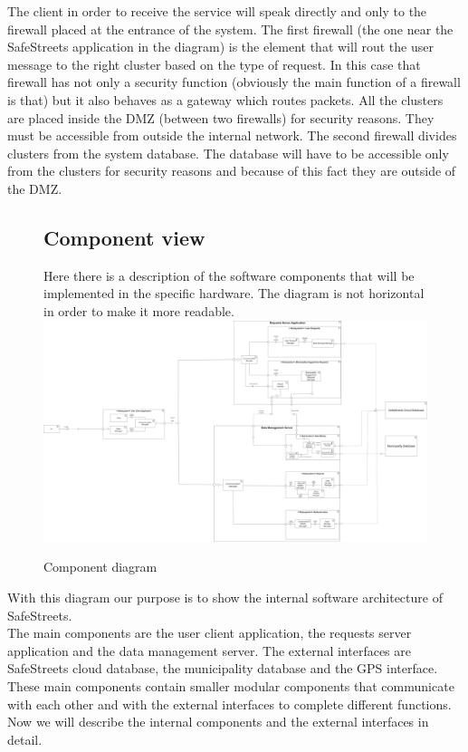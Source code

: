 \documentclass[titlepage]{article}
\begin{document}
The client in order to receive the service will speak directly and only to the firewall placed at the entrance of the system. The first firewall (the one near the SafeStreets application in the diagram) is the element that will rout the user message to the right cluster based on the type of request. In this case that firewall has not only a security function (obviously the main function of a firewall is that) but it also behaves as a gateway which routes packets. All the clusters are placed inside the DMZ (between two firewalls) for security reasons. They must be accessible from outside the internal network. The second firewall divides clusters from the system database. The database will have to be accessible only from the clusters for security reasons and because of this fact they are outside of the DMZ. \\

\begin{figure}[h]
\subsection{Component view}
Here there is a description of the software components that will be implemented in the specific hardware. The diagram is not horizontal in order to make it more readable.
	\includegraphics[scale=0.133, angle=-90]{Diagrams/Component diagram.png}
	\caption{Component diagram}
\end{figure}
\FloatBarrier

With this diagram our purpose is to show the internal software architecture of SafeStreets. \\
The main components are the user client application, the requests server application and the data management server. The external interfaces are SafeStreets cloud database, the municipality database and the GPS interface.\\
These main components contain smaller modular components that communicate with each other and with the external interfaces to complete different functions.\\
Now we will describe the internal components and the external interfaces in detail. \\
\end{document}
